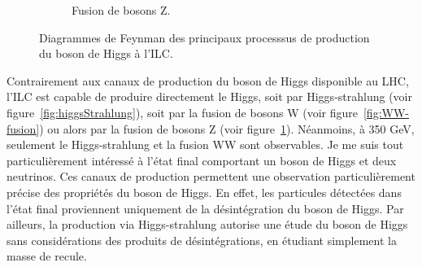\documentclass[a4papper, 10pt]{article}
\begin{document}
\begin{figure}
\begin{subfigure}[t]{0.3\textwidth}
            \caption{Fusion de bosons Z.}
            \label{fig:ZZ-fusion}
        \end{subfigure}
        \caption{Diagrammes de Feynman des principaux processsus de production du boson de Higgs à l'ILC\cite{Asner2013}\cite{tian}.}
        \label{fig:higgsProduction}
    \end{figure}    

  Contrairement aux canaux de production du boson de Higgs disponible au LHC, l'ILC est capable de produire directement le Higgs, soit par Higgs-strahlung (voir figure~\ref{fig:higgsStrahlung}), soit par la fusion de bosons W (voir figure~\ref{fig:WW-fusion}) ou alors par la fusion de bosons Z (voir figure~\ref{fig:ZZ-fusion}).
  Néanmoins, à 350 GeV, seulement le Higgs-strahlung et la fusion WW sont observables.
  Je me suis tout particulièrement intéressé à l'état final comportant un boson de Higgs et deux neutrinos.
  Ces canaux de production permettent une observation particulièrement précise des propriétés du boson de Higgs. 
  En effet, les particules détectées dans l'état final proviennent uniquement de la désintégration du boson de Higgs. 
  Par ailleurs, la production via Higgs-strahlung autorise une étude du boson de Higgs sans considérations des produits de désintégrations, en étudiant simplement la masse de recule.
  
\end{document}
